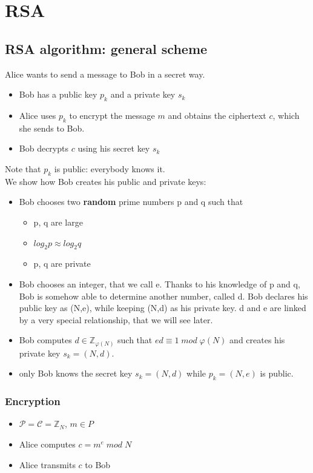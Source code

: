 \documentclass[a4paper, 10pt, titlepage]{article}
\begin{document}
\newpage
\section{RSA}
\subsection{RSA algorithm: general scheme}
Alice wants to send a message to Bob in a secret way.
\begin{itemize}
\item Bob has a public key $p_k$ and a private key $s_k$
\item Alice uses $p_k$ to encrypt the message $m$ and obtains the ciphertext $c$, which she sends to Bob.
\item Bob decrypts $c$ using his secret key $s_k$
\end{itemize}
Note that $p_k$ is public: everybody knows it. \\
We show how Bob creates his public and private keys:
\begin{itemize}
\item Bob chooses two \textbf{random} prime numbers p and q such that
\begin{itemize}
\item p, q are large
\item $log_2 p \approx log_2 q$
\item p, q are private
\end{itemize}
\item Bob chooses an integer, that we call e. Thanks to his knowledge of p and q, Bob is somehow able to determine another number, called d. Bob declares his public key as (N,e), while keeping (N,d) as his private key. d and e are linked by a very special relationship, that we will see later.
\item Bob computes $d \in \mathbb{Z}_{\varphi(N)}$ such that $ed \equiv 1 \; mod \; \varphi(N)$ and creates his private key $s_k = (N, d)$.
\item only Bob knows the secret key $s_k = (N, d)$ while $p_k = (N, e)$ is public.
\end{itemize}
\subsubsection{Encryption}
\begin{itemize}
\item $\mathcal{P} = \mathcal{C} = \mathbb{Z}_N$, $m \in P$
\item Alice computes $c = m^e \; mod \; N$
\item Alice transmits $c$ to Bob
\end{itemize}
\end{document}

